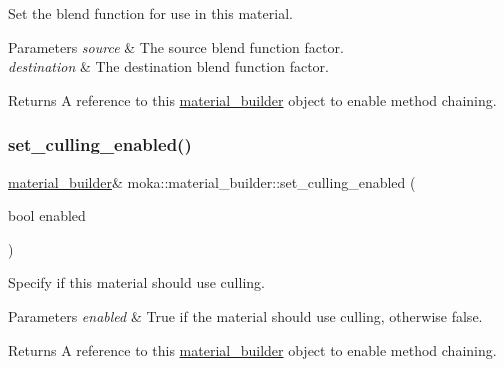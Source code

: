 Set the blend function for use in this material. 


\begin{DoxyParams}{Parameters}
{\em source} & The source blend function factor. \\
\hline
{\em destination} & The destination blend function factor. \\
\hline
\end{DoxyParams}
\begin{DoxyReturn}{Returns}
A reference to this \mbox{\hyperlink{classmoka_1_1material__builder}{material\+\_\+builder}} object to enable method chaining. 
\end{DoxyReturn}
\mbox{\label{classmoka_1_1material__builder_aa78682ff872e45859d862e6e31ba1caa}} 
\subsubsection{\texorpdfstring{set\_culling\_enabled()}{set\_culling\_enabled()}}
{\footnotesize\ttfamily \mbox{\hyperlink{classmoka_1_1material__builder}{material\+\_\+builder}}\& moka\+::material\+\_\+builder\+::set\+\_\+culling\+\_\+enabled (\begin{DoxyParamCaption}\item[{bool}]{enabled }\end{DoxyParamCaption})}



Specify if this material should use culling. 


\begin{DoxyParams}{Parameters}
{\em enabled} & True if the material should use culling, otherwise false. \\
\hline
\end{DoxyParams}
\begin{DoxyReturn}{Returns}
A reference to this \mbox{\hyperlink{classmoka_1_1material__builder}{material\+\_\+builder}} object to enable method chaining. 
\end{DoxyReturn}
\mbox{\label{classmoka_1_1material__builder_afd585663a729d53924ec312fbbd8dfed}} 
